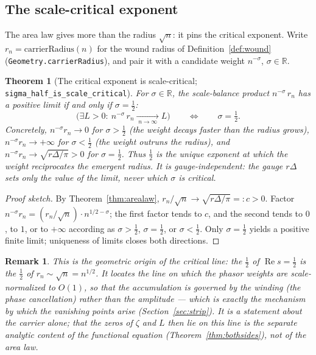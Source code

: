 \documentclass[11pt]{article}
\newtheorem{theorem}[definition]{Theorem}
\newtheorem{remark}[definition]{Remark}
\DeclareMathOperator{\Ree}{Re}
\newcommand{\R}{\mathbb{R}}
\newcommand{\code}[1]{\texttt{#1}}
\begin{document}
\subsection{The scale-critical exponent}\label{sub:scalecrit}

The area law gives more than the radius $\sqrt n$: it pins the critical exponent. Write
$r_n=\mathrm{carrierRadius}(n)$ for the wound radius of Definition~\ref{def:wound}
(\code{Geometry.carrierRadius}), and pair it with a candidate weight $n^{-\sigma}$, $\sigma\in\R$.

\begin{theorem}[The critical exponent is scale-critical; \code{sigma\_half\_is\_scale\_critical}]\label{thm:scalecrit}
For $\sigma\in\R$, the scale-balance product $n^{-\sigma}\,r_n$ has a positive limit if and only if
$\sigma=\tfrac12$:
\[
  \bigl(\exists L>0:\ n^{-\sigma}\,r_n\xrightarrow[\;n\to\infty\;]{}L\bigr)
  \qquad\Longleftrightarrow\qquad \sigma=\tfrac12 .
\]
Concretely, $n^{-\sigma}r_n\to 0$ for $\sigma>\tfrac12$ (the weight decays faster than the radius
grows), $n^{-\sigma}r_n\to+\infty$ for $\sigma<\tfrac12$ (the weight outruns the radius), and
$n^{-\sigma}r_n\to\sqrt{r\Delta/\pi}>0$ for $\sigma=\tfrac12$. Thus $\tfrac12$ is the unique exponent at
which the weight reciprocates the emergent radius. It is \emph{gauge-independent}: the gauge $r\Delta$
sets only the value of the limit, never which $\sigma$ is critical.
\end{theorem}

\begin{proof}[Proof sketch]
By Theorem~\ref{thm:arealaw}, $r_n/\sqrt n\to\sqrt{r\Delta/\pi}=:c>0$. Factor
$n^{-\sigma}r_n=(r_n/\sqrt n)\cdot n^{1/2-\sigma}$; the first factor tends to $c$, and the second tends
to $0$, to $1$, or to $+\infty$ according as $\sigma>\tfrac12$, $\sigma=\tfrac12$, or $\sigma<\tfrac12$.
Only $\sigma=\tfrac12$ yields a positive finite limit; uniqueness of limits closes both directions.
\end{proof}

\begin{remark}\label{rem:scalecrit}
This is the geometric origin of the critical line: the $\tfrac12$ of $\Ree s=\tfrac12$ is the $\tfrac12$
of $r_n\sim\sqrt n=n^{1/2}$. It locates the line on which the phasor weights are scale-normalized to
$O(1)$, so that the accumulation is governed by the winding (the phase cancellation) rather than the
amplitude --- which is exactly the mechanism by which the vanishing points arise
(Section~\ref{sec:strip}). It is a statement about the carrier alone; that the zeros of $\zeta$ and
$L$ then \emph{lie} on this line is the separate analytic content of the functional equation
(Theorem~\ref{thm:bothsides}), not of the area law.
\end{remark}
\end{document}
